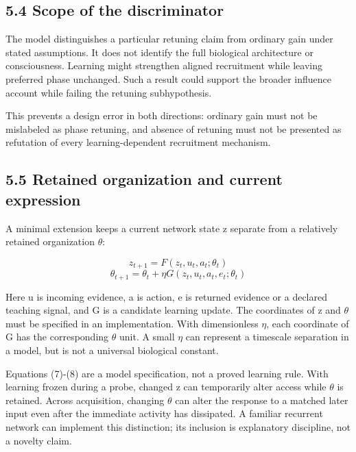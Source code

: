 \documentclass[
  american,
  11pt,
  letterpaper,
]{article}
\begin{document}
\subsection{5.4 Scope of the discriminator}\label{scope-of-the-discriminator}

The model distinguishes a particular retuning claim from ordinary gain under stated assumptions. It does not identify the full biological architecture or consciousness. Learning might strengthen aligned recruitment while leaving preferred phase unchanged. Such a result could support the broader influence account while failing the retuning subhypothesis.

This prevents a design error in both directions: ordinary gain must not be mislabeled as phase retuning, and absence of retuning must not be presented as refutation of every learning-dependent recruitment mechanism.

\subsection{5.5 Retained organization and current expression}\label{retained-organization-and-current-expression}

A minimal extension keeps a current network state z separate from a relatively retained organization \(\theta\):

\begin{equation}
z_{t+1}=F(z_t,u_t,a_t;\theta_t)\tag{7}
\end{equation} \begin{equation}
\theta_{t+1}=\theta_t+\eta G(z_t,u_t,a_t,e_t;\theta_t)\tag{8}
\end{equation}

Here u is incoming evidence, a is action, e is returned evidence or a declared teaching signal, and G is a candidate learning update. The coordinates of z and \(\theta\) must be specified in an implementation. With dimensionless \(\eta\), each coordinate of G has the corresponding \(\theta\) unit. A small \(\eta\) can represent a timescale separation in a model, but is not a universal biological constant.

Equations (7)-(8) are a model specification, not a proved learning rule. With learning frozen during a probe, changed z can temporarily alter access while \(\theta\) is retained. Across acquisition, changing \(\theta\) can alter the response to a matched later input even after the immediate activity has dissipated. A familiar recurrent network can implement this distinction; its inclusion is explanatory discipline, not a novelty claim.
\end{document}

